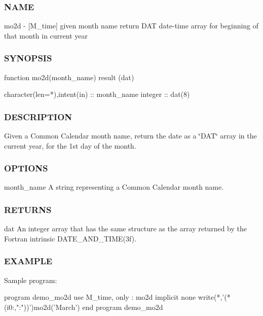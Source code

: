 \begin{DoxyVerb}
\subsubsection*{N\+A\+ME}

mo2d -\/ \mbox{[}M\+\_\+time\mbox{]} given month name return D\+AT date-\/time array for beginning of that month in current year 

\subsubsection*{S\+Y\+N\+O\+P\+S\+IS}

\begin{DoxyVerb}   function mo2d(month_name) result (dat)

    character(len=*),intent(in) :: month_name
    integer                     :: dat(8)
\end{DoxyVerb}


\subsubsection*{D\+E\+S\+C\+R\+I\+P\+T\+I\+ON}

Given a Common Calendar month name, return the date as a \char`\"{}\+D\+A\+T\char`\"{} array in the current year, for the 1st day of the month.

\subsubsection*{O\+P\+T\+I\+O\+NS}

month\+\_\+name A string representing a Common Calendar month name. \subsubsection*{R\+E\+T\+U\+R\+NS}

dat An integer array that has the same structure as the array returned by the Fortran intrinsic D\+A\+T\+E\+\_\+\+A\+N\+D\+\_\+\+T\+I\+M\+E(3f).

\subsubsection*{E\+X\+A\+M\+P\+LE}

\begin{DoxyVerb}Sample program:

 program demo_mo2d
 use M_time, only : mo2d
 implicit none
    write(*,'(*(i0:,":"))')mo2d('March')
 end program demo_mo2d


\end{DoxyVerb}
\end{DoxyVerb}
